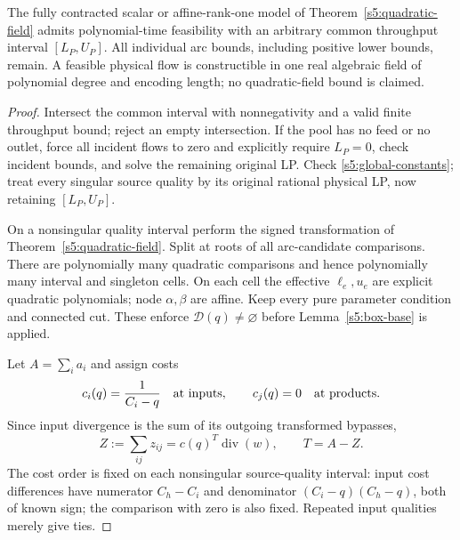 \begin{theorem}
\label{s5:restrictive-capacity}
The fully contracted scalar or affine-rank-one model of
Theorem~\ref{s5:quadratic-field} admits polynomial-time feasibility with
an arbitrary common throughput interval $[L_P,U_P]$. All individual
arc bounds, including positive lower bounds, remain. A feasible physical
flow is constructible in one real algebraic field of polynomial degree
and encoding length; no quadratic-field bound is claimed.
\end{theorem}
\begin{proof}
Intersect the common interval with nonnegativity and a valid finite
throughput bound; reject an empty intersection. If the pool has no feed
or no outlet, force all incident flows to zero and explicitly require
$L_P=0$, check incident bounds, and solve the remaining original LP.
Check \eqref{s5:global-constants}; treat every singular source quality
by its original rational physical LP, now retaining $[L_P,U_P]$.

On a nonsingular quality interval perform the signed transformation
of Theorem~\ref{s5:quadratic-field}. Split at roots of all arc-candidate
comparisons. There are polynomially many quadratic comparisons and
hence polynomially many interval and singleton cells. On each cell the
effective $\ell_e,u_e$ are explicit quadratic polynomials; node
$\alpha,\beta$ are affine. Keep every pure parameter condition and
connected cut. These enforce $\mathcal D(q)\ne\varnothing$ before
Lemma~\ref{s5:box-base} is applied.

Let $A=\sum_i a_i$ and assign costs
\[
 c_i(q)=\frac1{C_i-q}\quad\hbox{at inputs},\qquad
 c_j(q)=0\quad\hbox{at products}.
\]
Since input divergence is the sum of its outgoing transformed bypasses,
\begin{equation}
 Z:=\sum_{ij}z_{ij}=c(q)^T\operatorname{div}(w),\qquad T=A-Z.
 \label{s5:throughput-support}
\end{equation}
The cost order is fixed on each nonsingular source-quality interval:
input cost differences have numerator $C_h-C_i$ and denominator
$(C_i-q)(C_h-q)$, both of known sign; the comparison with zero is
also fixed. Repeated input qualities merely give ties.


\end{proof}
